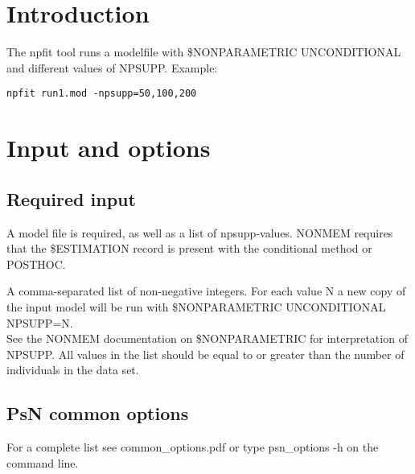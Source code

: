 

\newcommand{\guidetoolname}{npfit}



\maketitle


\section{Introduction}

The npfit tool runs a modelfile with \$NONPARAMETRIC UNCONDITIONAL and different values of NPSUPP.
Example:
\begin{verbatim}
npfit run1.mod -npsupp=50,100,200
\end{verbatim}

\section{Input and options}

\subsection{Required input}
A model file is required, as well as a list of npsupp-values. NONMEM requires that the \$ESTIMATION record is present with the conditional method or POSTHOC.
\begin{optionlist}
A comma-separated list of non-negative integers. For each value N a new copy of the input model will be run with \$NONPARAMETRIC UNCONDITIONAL NPSUPP=N.\\ See the NONMEM documentation on \$NONPARAMETRIC for interpretation of NPSUPP.
All values in the list should be equal to or greater than the number of individuals in the data set.
\nextopt
\end{optionlist}





\subsection{PsN common options}
For a complete list see common\_options.pdf or type psn\_options -h on the command line.

